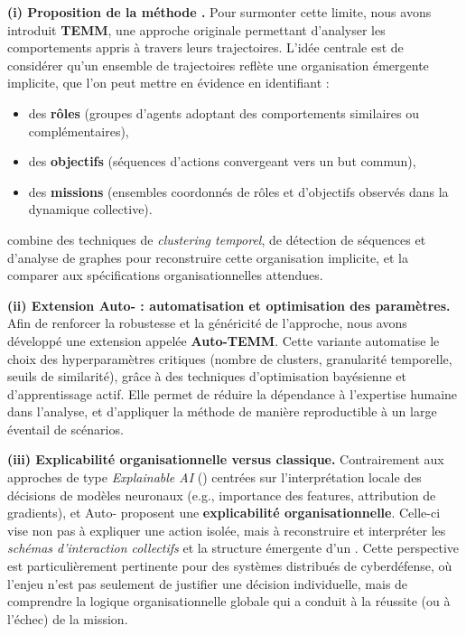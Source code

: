 \medskip
\noindent
\textbf{(i) Proposition de la méthode .}
Pour surmonter cette limite, nous avons introduit \textbf{TEMM}, une approche originale permettant d’analyser les comportements appris à travers leurs trajectoires.
L’idée centrale est de considérer qu’un ensemble de trajectoires reflète une organisation émergente implicite, que l’on peut mettre en évidence en identifiant :
\begin{itemize}
  \item des \textbf{rôles} (groupes d’agents adoptant des comportements similaires ou complémentaires),
  \item des \textbf{objectifs} (séquences d’actions convergeant vers un but commun),
  \item des \textbf{missions} (ensembles coordonnés de rôles et d’objectifs observés dans la dynamique collective).
\end{itemize}
 combine des techniques de \textit{clustering temporel}, de détection de séquences et d’analyse de graphes pour reconstruire cette organisation implicite, et la comparer aux spécifications organisationnelles attendues.

\medskip
\noindent
\textbf{(ii) Extension Auto- : automatisation et optimisation des paramètres.}
Afin de renforcer la robustesse et la généricité de l’approche, nous avons développé une extension appelée \textbf{Auto-TEMM}.
Cette variante automatise le choix des hyperparamètres critiques (nombre de clusters, granularité temporelle, seuils de similarité), grâce à des techniques d’optimisation bayésienne et d’apprentissage actif.
Elle permet de réduire la dépendance à l’expertise humaine dans l’analyse, et d’appliquer la méthode de manière reproductible à un large éventail de scénarios.

\medskip
\noindent
\textbf{(iii) Explicabilité organisationnelle versus  classique.}
Contrairement aux approches de type \textit{Explainable AI} () centrées sur l’interprétation locale des décisions de modèles neuronaux (e.g., importance des features, attribution de gradients),  et Auto- proposent une \textbf{explicabilité organisationnelle}.
Celle-ci vise non pas à expliquer une action isolée, mais à reconstruire et interpréter les \textit{schémas d’interaction collectifs} et la structure émergente d’un .
Cette perspective est particulièrement pertinente pour des systèmes distribués de cyberdéfense, où l’enjeu n’est pas seulement de justifier une décision individuelle, mais de comprendre la logique organisationnelle globale qui a conduit à la réussite (ou à l’échec) de la mission.

